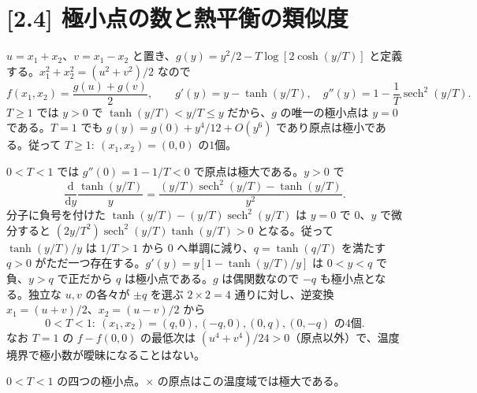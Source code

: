 \documentclass[11pt,a4paper]{article}
\begin{document}
\section*{[2.4] 極小点の数と熱平衡の類似度}
$u=x_1+x_2$、$v=x_1-x_2$ と置き、$g(y)=y^2/2-T\log[2\cosh(y/T)]$ と定義する。$x_1^2+x_2^2=(u^2+v^2)/2$ なので
\begin{equation}
f(x_1,x_2)=\frac{g(u)+g(v)}2,
\qquad g'(y)=y-\tanh(y/T),\quad
g''(y)=1-\frac1T\operatorname{sech}^2(y/T).
\end{equation}
$T\ge1$ では $y>0$ で $\tanh(y/T)<y/T\le y$ だから、$g$ の唯一の極小点は $y=0$ である。$T=1$ でも $g(y)=g(0)+y^4/12+O(y^6)$ であり原点は極小である。従って $\boxed{T\ge1:\ (x_1,x_2)=(0,0)\text{ の1個}}$。

$0<T<1$ では $g''(0)=1-1/T<0$ で原点は極大である。$y>0$ で
\begin{equation}
\frac{\mathrm d}{\mathrm dy}\frac{\tanh(y/T)}{y}
=\frac{(y/T)\operatorname{sech}^2(y/T)-\tanh(y/T)}{y^2}.
\end{equation}
分子に負号を付けた $\tanh(y/T)-(y/T)\operatorname{sech}^2(y/T)$ は $y=0$ で $0$、$y$ で微分すると $(2y/T^2)\allowbreak\operatorname{sech}^2(y/T)\allowbreak\tanh(y/T)>0$ となる。従って $\tanh(y/T)/y$ は $1/T>1$ から $0$ へ単調に減り、$q=\tanh(q/T)$ を満たす $q>0$ がただ一つ存在する。$g'(y)=y[1-\tanh(y/T)/y]$ は $0<y<q$ で負、$y>q$ で正だから $q$ は極小点である。$g$ は偶関数なので $-q$ も極小点となる。独立な $u,v$ の各々が $\pm q$ を選ぶ $2\times2=4$ 通りに対し、逆変換 $x_1=(u+v)/2$、$x_2=(u-v)/2$ から
\begin{equation}
\boxed{0<T<1:\ (x_1,x_2)=(q,0),(-q,0),(0,q),(0,-q)\text{ の4個}}.
\end{equation}
なお $T=1$ の $f-f(0,0)$ の最低次は $(u^4+v^4)/24>0$（原点以外）で、温度境界で極小数が曖昧になることはない。

\begin{center}

{\small $0<T<1$ の四つの極小点。$\times$ の原点はこの温度域では極大である。}
\end{center}
\end{document}
